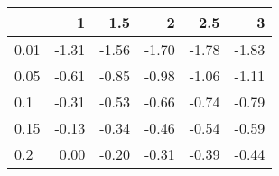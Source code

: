 
\begin{tabular}{lrrrrr}
\toprule
  & 1 & 1.5 & 2 & 2.5 & 3\\
\midrule
0.01 & -1.31 & -1.56 & -1.70 & -1.78 & -1.83\\
0.05 & -0.61 & -0.85 & -0.98 & -1.06 & -1.11\\
0.1 & -0.31 & -0.53 & -0.66 & -0.74 & -0.79\\
0.15 & -0.13 & -0.34 & -0.46 & -0.54 & -0.59\\
0.2 & 0.00 & -0.20 & -0.31 & -0.39 & -0.44\\
\bottomrule
\end{tabular}
